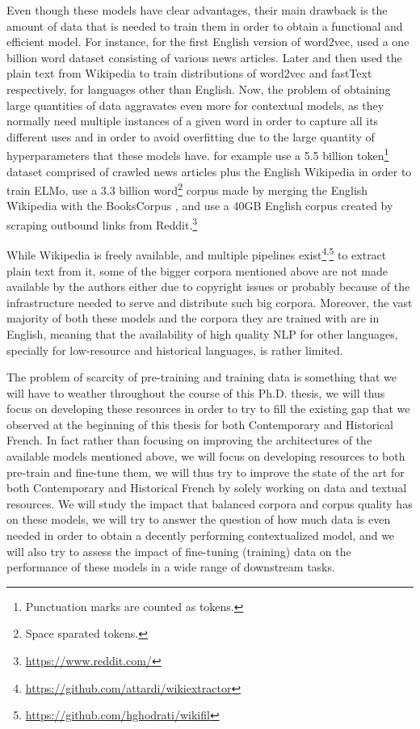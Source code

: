 Even though these models have clear advantages, their main drawback is the amount of data that is needed to train them in order to obtain a functional and efficient model. For instance, for the first English version of word2vec, \citet{mikolov-etal-2013-distributed} used a one billion word dataset consisting of various news articles. Later \citet{al-rfou-etal-2013-polyglot} and then \citet{bojanowski-etal-2017-enriching} used the plain text from Wikipedia to train distributions of word2vec and fastText respectively, for languages other than English. Now, the problem of obtaining large quantities of data aggravates even more for contextual models, as they normally need multiple instances of a given word in order to capture all its different uses and in order to avoid overfitting due to the large quantity of hyperparameters that these models have. \citet{peters-etal-2018-deep} for example use a 5.5 billion token\footnote{Punctuation marks are counted as tokens.} dataset comprised of crawled news articles plus the English Wikipedia in order to train ELMo, \citet{devlin-etal-2019-bert} use a 3.3 billion word\footnote{Space sparated tokens.} corpus made by merging the English Wikipedia with the BooksCorpus \citep{zhu-etal-2015-aligning}, and \citet{radford-etal-2019-language} use a 40GB English corpus created by scraping outbound links from Reddit.\footnote{\url{https://www.reddit.com/}}

While Wikipedia is freely available, and multiple pipelines exist\footnote{\url{https://github.com/attardi/wikiextractor}}\textsuperscript{,}\footnote{\url{https://github.com/hghodrati/wikifil}} to extract plain text from it, some of the bigger corpora mentioned above are not made available by the authors either due to copyright issues or probably because of the infrastructure needed to serve and distribute such big corpora. Moreover, the vast majority of both these models and the corpora they are trained with are in English, meaning that the availability of high quality NLP for other languages, specially for low-resource and historical languages, is rather limited.

The problem of scarcity of pre-training and training data is something that we will have to weather throughout the course of this Ph.D. thesis, we will thus focus on developing these resources in order to try to fill the existing gap that we observed at the beginning of this thesis for both Contemporary and Historical French. In fact rather than focusing on improving the architectures of the available models mentioned above, we will focus on developing resources to both pre-train and fine-tune them, we will thus try to improve the state of the art for both Contemporary and Historical French by solely working on data and textual resources. We will study the impact that balanced corpora and corpus quality has on these models, we will try to answer the question of how much data is even needed in order to obtain a decently performing contextualized model, and we will also try to assess the impact of fine-tuning (training) data on the performance of these models in a wide range of downstream tasks.

